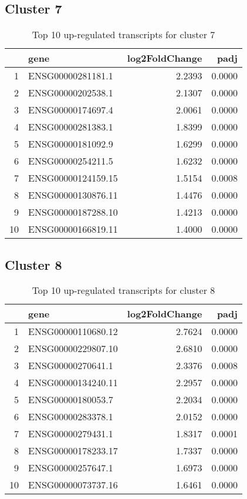 \documentclass{article}
\begin{document}
\subsection{Cluster 7 }
\begin{table}[H]
\centering
\begin{tabular}{rlrr}
  \hline
 & gene & log2FoldChange & padj \\ 
  \hline
1 & ENSG00000281181.1 & 2.2393 & 0.0000 \\ 
  2 & ENSG00000202538.1 & 2.1307 & 0.0000 \\ 
  3 & ENSG00000174697.4 & 2.0061 & 0.0000 \\ 
  4 & ENSG00000281383.1 & 1.8399 & 0.0000 \\ 
  5 & ENSG00000181092.9 & 1.6299 & 0.0000 \\ 
  6 & ENSG00000254211.5 & 1.6232 & 0.0000 \\ 
  7 & ENSG00000124159.15 & 1.5154 & 0.0008 \\ 
  8 & ENSG00000130876.11 & 1.4476 & 0.0000 \\ 
  9 & ENSG00000187288.10 & 1.4213 & 0.0000 \\ 
  10 & ENSG00000166819.11 & 1.4000 & 0.0000 \\ 
   \hline
\end{tabular}
\caption{Top 10 up-regulated transcripts for cluster 7} 
\label{tab:q3_1_7}
\end{table}
\subsection{Cluster 8 }
\begin{table}[H]
\centering
\begin{tabular}{rlrr}
  \hline
 & gene & log2FoldChange & padj \\ 
  \hline
1 & ENSG00000110680.12 & 2.7624 & 0.0000 \\ 
  2 & ENSG00000229807.10 & 2.6810 & 0.0000 \\ 
  3 & ENSG00000270641.1 & 2.3376 & 0.0008 \\ 
  4 & ENSG00000134240.11 & 2.2957 & 0.0000 \\ 
  5 & ENSG00000180053.7 & 2.2034 & 0.0000 \\ 
  6 & ENSG00000283378.1 & 2.0152 & 0.0000 \\ 
  7 & ENSG00000279431.1 & 1.8317 & 0.0001 \\ 
  8 & ENSG00000178233.17 & 1.7337 & 0.0000 \\ 
  9 & ENSG00000257647.1 & 1.6973 & 0.0000 \\ 
  10 & ENSG00000073737.16 & 1.6461 & 0.0000 \\ 
   \hline
\end{tabular}
\caption{Top 10 up-regulated transcripts for cluster 8} 
\label{tab:q3_1_8}
\end{table}
\end{document}
